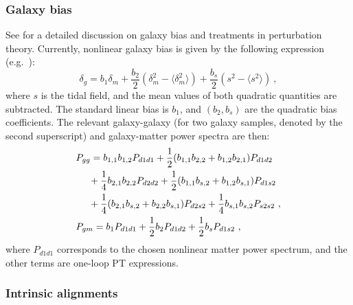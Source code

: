 \documentclass[\docopts]{\docclass}
\begin{document}
\subsubsection{Galaxy bias}
See \cite{desjacques18rev} for a detailed discussion on galaxy bias and treatments in perturbation theory. Currently, nonlinear galaxy bias is given by the following expression (e.g.\ \citealp{baldauf12}):
\begin{equation}
  \delta_{g} = b_1 \delta_m +\frac{b_2}{2} (\delta_m^2 - \langle \delta_m^2 \rangle) +
  \frac{b_s}{2} (s^2 - \langle s^2 \rangle) ~,
\end{equation}
where $s$ is the tidal field, and the mean values of both quadratic quantities are subtracted.
The standard linear bias is $b_1$, and $(b_2,b_s)$ are the quadratic bias coefficients.
The relevant galaxy-galaxy (for two galaxy samples, denoted by the second superscript) and galaxy-matter power spectra are then:
\begin{align}
  &P_{gg} = b_{1,1} b_{1,2} P_{d1d1} +
               \frac{1}{2} (b_{1,1} b_{2,2} + b_{1,2} b_{2,1}) P_{d1d2} \notag\\
               &~~~~ + \frac{1}{4} b_{2,1} b_{2,2} P_{d2d2} +
               \frac{1}{2} (b_{1,1} b_{s,2} + b_{1,2} b_{s,1}) P_{d1s2} \notag\\
               &~~~~ + \frac{1}{4} (b_{2,1} b_{s,2} + b_{2,2} b_{s,1}) P_{d2s2} +
               \frac{1}{4} b_{s,1} b_{s,2} P_{s2s2}~,\\
  &P_{gm} = b_1 P_{d1d1} + \frac{1}{2}b_2 P_{d1d2} + \frac{1}{2} b_s P_{d1s2}~,
\end{align}
where $P_{d1d1}$ corresponds to the chosen nonlinear matter power spectrum,
and the other terms are one-loop PT expressions.

\subsubsection{Intrinsic alignments}
\end{document}
